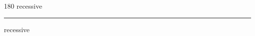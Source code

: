 
\begin{frame}
\begin{center}
\begin{turn}{180}
{\fontsize{2.5cm}{1em}\selectfont recessive}
\end{turn}
\vspace{1em}\par  
\hrule
\vspace{1em}\par  
{\fontsize{2.5cm}{1em}\selectfont recessive}
\end{center}
\end{frame}
